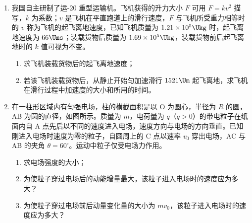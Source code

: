 \documentclass[\gkver]{gaokaozhenti}
\begin{document}
\begin{enumerate}
\item
我国自主研制了运-20 重型运输机。飞机获得的升力大小 $F$ 可用 $F=kv^{2}$ 描写，$k$ 为系数；$v$ 是飞机在平直跑道上的滑行速度，$F$ 与飞机所受重力相等时的 $v$ 称为飞机的起飞离地速度，已知飞机质量为 $1.21\times10^{5}\Ukg$ 时，起飞离地速度为 $66\Ums$；装载货物后质量为 $1.69\times10^{5}\Ukg$，装载货物前后起飞离地时的 $k$ 值可视为不变。
\begin{enumerate}
	\item
	求飞机装载货物后的起飞离地速度；
	\item
	若该飞机装载货物后，从静止开始匀加速滑行 $1521\Um$ 起飞离地，求飞机在滑行过程中加速度的大小和所用的时间。
\end{enumerate}

\item
在一柱形区域内有匀强电场，柱的横截面积是以 O 为圆心，半径为 $R$ 的圆，AB 为圆的直径，如图所示。质量为 $m$，电荷量为 $q$（$q>0$）的带电粒子在纸面内自 A 点先后以不同的速度进入电场，速度方向与电场的方向垂直。已知刚进入电场时速度为零的粒子，自圆周上的 C 点以速率 $v_{0}$ 穿出电场，AC 与 AB 的夹角 $\theta=60^\circ$。运动中粒子仅受电场力作用。
\begin{enumerate}
	\item
	求电场强度的大小；
	\item
	为使粒子穿过电场后的动能增量最大，该粒子进入电场时的速度应为多大？
	\item
	为使粒子穿过电场前后动量变化量的大小为 $mv_{0}$，该粒子进入电场时的速度应为多大？
\end{enumerate}
\onepicture[align=right, w=5.5cm]{}
\end{enumerate}
\end{document}
